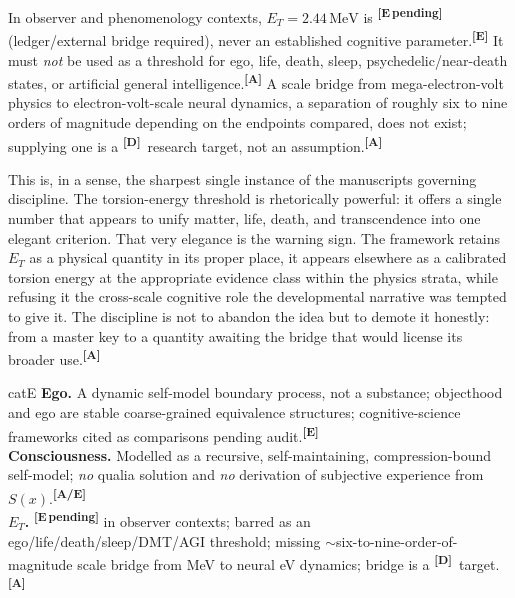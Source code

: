\documentclass[12pt,a4paper,twoside]{article}
\theoremstyle{plain}
\theoremstyle{definition}
\theoremstyle{remark}
\newcommand{\MeV}{\,\mathrm{MeV}}
\newcommand{\catmark}[1]{\textsuperscript{\textsf{\textbf{[#1]}}}}
\newcommand{\ETorsion}{2.44\MeV} %
\begin{document}
\begin{governancebox}
In observer and phenomenology contexts, $E_T = \ETorsion$ is \catmark{E\,pending} (ledger/external bridge required), never an established cognitive parameter.\catmark{E} It must \emph{not} be used as a threshold for ego, life, death, sleep, psychedelic/near-death states, or artificial general intelligence.\catmark{A} A scale bridge from mega-electron-volt physics to electron-volt-scale neural dynamics, a separation of roughly six to nine orders of magnitude depending on the endpoints compared, does not exist; supplying one is a \catmark{D}\ research target, not an assumption.\catmark{A}
\end{governancebox}

\noindent This is, in a sense, the sharpest single instance of the manuscripts governing discipline. The torsion-energy threshold is rhetorically powerful: it offers a single number that appears to unify matter, life, death, and transcendence into one elegant criterion. That very elegance is the warning sign. The framework retains $E_T$ as a physical quantity in its proper place, it appears elsewhere as a calibrated torsion energy at the appropriate evidence class within the physics strata, while refusing it the cross-scale cognitive role the developmental narrative was tempted to give it. The discipline is not to abandon the idea but to demote it honestly: from a master key to a quantity awaiting the bridge that would license its broader use.\catmark{A}

\begin{evidencebox}{catE}
\textbf{Ego.} A dynamic self-model boundary process, not a substance; objecthood and ego are stable coarse-grained equivalence structures; cognitive-science
frameworks cited as comparisons pending audit.\catmark{E}\\[0.3em]
\textbf{Consciousness.} Modelled as a recursive, self-maintaining, compression-bound self-model; \emph{no} qualia solution and \emph{no} derivation
of subjective experience from $S(x)$.\catmark{A/E}\\[0.3em]
\textbf{$E_T$.} \catmark{E\,pending} in observer contexts; barred as an ego/life/death/sleep/DMT/AGI threshold; missing $\sim$six-to-nine-order-of-magnitude scale bridge from MeV to neural eV dynamics; bridge is a \catmark{D}\ target.\catmark{A}
\end{evidencebox}

\end{document}
